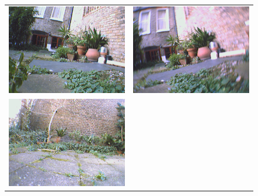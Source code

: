 \documentclass[11pt]{report}
\begin{document}
\begin{figure}[H]
\begin{tabular}{cc}
\includegraphics[scale=0.25]{images/garden1_left.png} &
\includegraphics[scale=0.25]{images/garden1_right.png} \\
\includegraphics[scale=0.25]{images/garden2_left.png} &

\end{tabular}
\end{figure}
\end{document}
